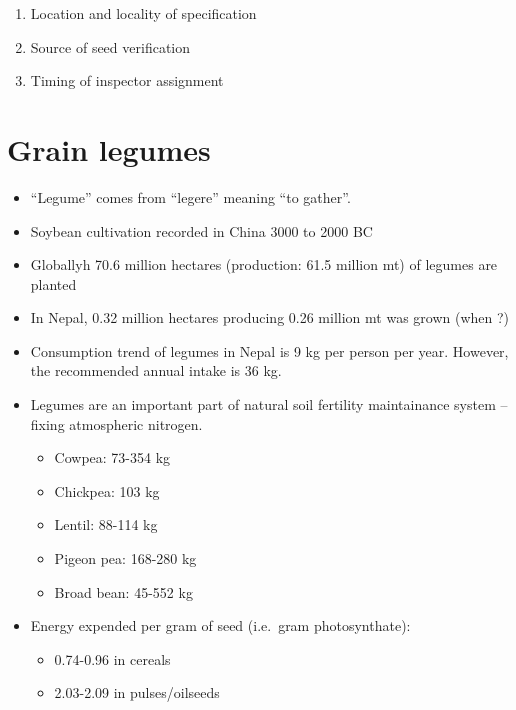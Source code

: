 \documentclass[
  openany]{book}
\providecommand{\tightlist}{%
  \setlength{\itemsep}{0pt}\setlength{\parskip}{0pt}}
\begin{document}
\begin{itemize}
  \begin{enumerate}
  \def\labelenumi{\arabic{enumi}.}
  \setcounter{enumi}{1}
  \tightlist
  \item
    Location and locality of specification
  \item
    Source of seed verification
  \item
    Timing of inspector assignment
  \end{enumerate}
\end{itemize}

\hypertarget{grain-legumes}{%
\section{Grain legumes}\label{grain-legumes}}

\begin{itemize}
\tightlist
\item
  ``Legume'' comes from ``legere'' meaning ``to gather''.
\item
  Soybean cultivation recorded in China 3000 to 2000 BC
\item
  Globallyh 70.6 million hectares (production: 61.5 million mt) of legumes are planted
\item
  In Nepal, 0.32 million hectares producing 0.26 million mt was grown (when ?)
\item
  Consumption trend of legumes in Nepal is 9 kg per person per year. However, the recommended annual intake is 36 kg.
\item
  Legumes are an important part of natural soil fertility maintainance system -- fixing atmospheric nitrogen.

  \begin{itemize}
  \tightlist
  \item
    Cowpea: 73-354 kg
  \item
    Chickpea: 103 kg
  \item
    Lentil: 88-114 kg
  \item
    Pigeon pea: 168-280 kg
  \item
    Broad bean: 45-552 kg
  \end{itemize}
\item
  Energy expended per gram of seed (i.e.~gram photosynthate):

  \begin{itemize}
  \tightlist
  \item
    0.74-0.96 in cereals
  \item
    2.03-2.09 in pulses/oilseeds
  \end{itemize}
\end{itemize}
\end{document}
